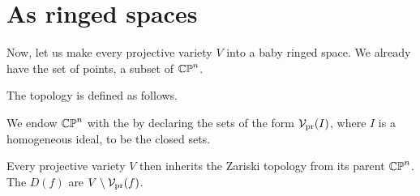 \section{As ringed spaces}
Now, let us make every projective variety $V$ into a baby ringed space.
We already have the set of points, a subset of $\mathbb{CP}^n$.

The topology is defined as follows.
\begin{definition}
	We endow $\mathbb{CP}^n$ with the 
	by declaring the sets of the form $\mathcal V_{\text{pr}}(I)$,
	where $I$ is a homogeneous ideal, to be the closed sets.

	Every projective variety $V$ then inherits the Zariski
	topology from its parent $\mathbb{CP}^n$.
	The  $D(f)$ are $V \setminus \mathcal V_{\text{pr}}(f)$.
\end{definition}

